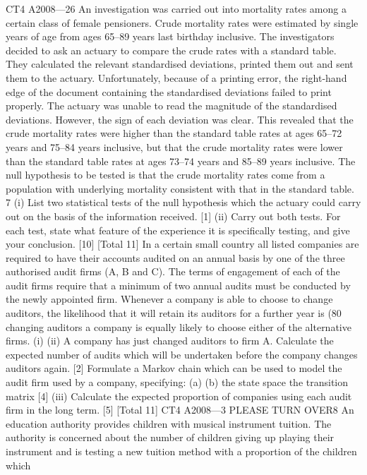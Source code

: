 CT4 A2008—26
An investigation was carried out into mortality rates among a certain class of female
pensioners. Crude mortality rates were estimated by single years of age from ages
65–89 years last birthday inclusive. The investigators decided to ask an actuary to
compare the crude rates with a standard table. They calculated the relevant
standardised deviations, printed them out and sent them to the actuary.
Unfortunately, because of a printing error, the right-hand edge of the document
containing the standardised deviations failed to print properly. The actuary was
unable to read the magnitude of the standardised deviations. However, the sign of
each deviation was clear. This revealed that the crude mortality rates were higher
than the standard table rates at ages 65–72 years and 75–84 years inclusive, but that
the crude mortality rates were lower than the standard table rates at ages 73–74 years
and 85–89 years inclusive.
The null hypothesis to be tested is that the crude mortality rates come from a
population with underlying mortality consistent with that in the standard table.
7
(i) List two statistical tests of the null hypothesis which the actuary could carry
out on the basis of the information received.
[1]
(ii) Carry out both tests. For each test, state what feature of the experience it is
specifically testing, and give your conclusion.
[10]
[Total 11]
In a certain small country all listed companies are required to have their accounts
audited on an annual basis by one of the three authorised audit firms (A, B and C).
The terms of engagement of each of the audit firms require that a minimum of two
annual audits must be conducted by the newly appointed firm. Whenever a company
is able to choose to change auditors, the likelihood that it will retain its auditors for a
further year is (80%
changing auditors a company is equally likely to choose either of the alternative firms.
(i)
(ii)
A company has just changed auditors to firm A. Calculate the expected
number of audits which will be undertaken before the company changes
auditors again.
[2]
Formulate a Markov chain which can be used to model the audit firm used by
a company, specifying:
(a)
(b)
the state space
the transition matrix
[4]
(iii)
Calculate the expected proportion of companies using each audit firm in the
long term.
[5]
[Total 11]
CT4 A2008—3
PLEASE TURN OVER8
An education authority provides children with musical instrument tuition. The
authority is concerned about the number of children giving up playing their
instrument and is testing a new tuition method with a proportion of the children which
